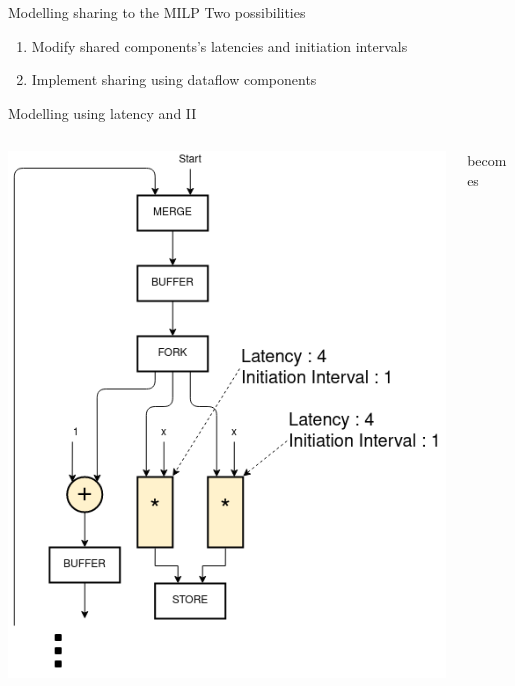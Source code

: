 \documentclass{beamer}
\begin{document}
\begin{frame}{Modelling sharing to the MILP}
Two possibilities
\begin{enumerate}
    \item Modify shared components's latencies and initiation intervals
    \item Implement sharing using dataflow components
\end{enumerate}
\end{frame}

\begin{frame}{Modelling using latency and II}
      \begin{columns}[T]
    \begin{column}{0.25\textwidth}
        \begin{center}
      \includegraphics[scale=0.25]{latency_unshared.png}
    \end{center}
    \end{column}
    \begin{column}{0.1\textwidth}
    \begin{center}
        becomes
    \end{center}

\end{column}
\end{columns}
\end{frame}
\end{document}
